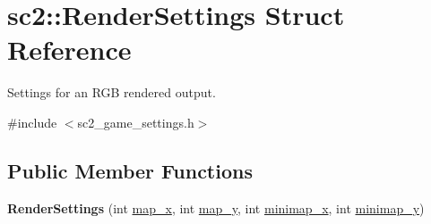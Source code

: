 \hypertarget{structsc2_1_1_render_settings}{}\section{sc2\+:\+:Render\+Settings Struct Reference}
\label{structsc2_1_1_render_settings}


Settings for an R\+GB rendered output.  




{\ttfamily \#include $<$sc2\+\_\+game\+\_\+settings.\+h$>$}

\subsection*{Public Member Functions}
\begin{DoxyCompactItemize}
\item 
\mbox{\label{structsc2_1_1_render_settings_ada24b3e0643e879a779af383356484bb}} 
{\bfseries Render\+Settings} (int \hyperlink{structsc2_1_1_render_settings_a330b0d96688b42703928e26e0feb305f}{map\+\_\+x}, int \hyperlink{structsc2_1_1_render_settings_ac565d5076b37c1ad8d6a7896900af9f7}{map\+\_\+y}, int \hyperlink{structsc2_1_1_render_settings_a9c0da03ae27b40786ed3b78b978731ca}{minimap\+\_\+x}, int \hyperlink{structsc2_1_1_render_settings_af939a393029d7cb7c899e7da543b8bb4}{minimap\+\_\+y})
\end{DoxyCompactItemize}
